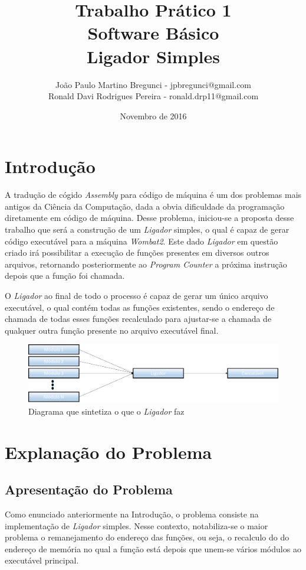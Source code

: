 \documentclass{article}
\title{Trabalho Prático 1 \\ Software Básico
\\ Ligador Simples}
\author{João Paulo Martino Bregunci - jpbregunci@gmail.com
\\ Ronald Davi Rodrigues Pereira - ronald.drp11@gmail.com}
\date{Novembro de 2016}
\begin{document}
\maketitle


\section{Introdução}
A tradução de cógido \textit{Assembly} para código de máquina é um dos problemas mais antigos da Ciência da Computação, dada a obvia dificuldade da programação diretamente em código de máquina. Desse problema, iniciou-se a proposta desse trabalho que será a construção de um \textit{Ligador} simples, o qual é capaz de gerar código executável para a máquina \textit{Wombat2}. Este dado \textit{Ligador} em questão criado irá possibilitar a execução de funções presentes em diversos outros arquivos, retornando posteriormente ao \textit{Program Counter} a próxima instrução depois que a função foi chamada.

O \textit{Ligador} ao final de todo o processo é capaz de gerar um único arquivo executável, o qual contém todas as funções existentes, sendo o endereço de chamada de todas esses funções recalculado para ajustar-se a chamada de qualquer outra função presente no arquivo executável final.


\begin{figure}[h!]
\centering
\includegraphics[scale=0.4]{ImagemTP2.png}
\caption{Diagrama que sintetiza o que o \textit{Ligador} faz}
\label{fig:trieExample}
\end{figure}

\section{Explanação do Problema}
\subsection{Apresentação do Problema}
Como enunciado anteriormente na Introdução, o problema consiste na implementação de \textit{Ligador} simples. Nesse contexto, notabiliza-se o maior problema o remanejamento do endereço das funções, ou seja, o recalculo do do endereço de memória no qual a função está depois que unem-se vários módulos ao executável principal.
\end{document}
